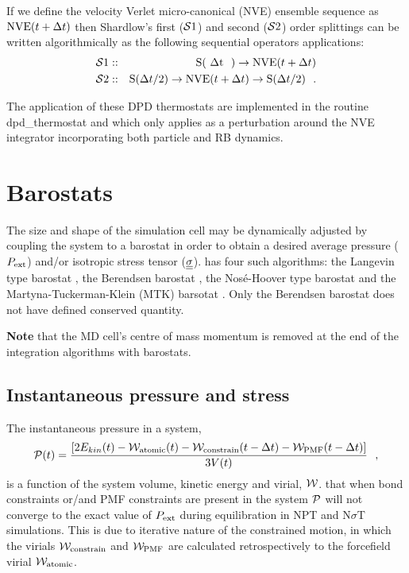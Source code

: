 If we define the velocity Verlet micro-canonical (NVE) ensemble sequence as
${\rm NVE}(t + \Delta t)$ then Shardlow's first (${\cal S}1$) and second (${\cal S}2$)
order splittings can be written algorithmically as the following sequential operators applications:
\begin{eqnarray}
{\cal S}1 &::& {\rm S(~\Delta t~~)} \rightarrow {\rm NVE}(t + \Delta t) \nonumber \\
{\cal S}2 &::& {\rm S}(\Delta t / 2) \rightarrow {\rm NVE}(t + \Delta t) \rightarrow {\rm S}(\Delta t / 2)~~.
\end{eqnarray}

The application of these DPD thermostats are implemented in the \D routine
{\sc dpd\_thermostat} and which only applies as a perturbation around the
NVE integrator incorporating both particle and RB dynamics.

\section{Barostats}

The size and shape of the simulation cell may be dynamically
adjusted by coupling the system to a barostat in order to obtain a
desired average pressure ($P_{\rm ext}$) and/or isotropic stress
tensor ($\mbox{$\underline{\underline{\bf \sigma}}$}$).  \D has four such
algorithms: the Langevin type barostat \cite{quigley-04a},
the Berendsen barostat \cite{berendsen-84a}, the
Nos\'{e}-Hoover type barostat \cite{hoover-85a} and the
Martyna-Tuckerman-Klein (MTK) barsotat \cite{martyna-96a}.  Only
the Berendsen barostat does not have defined conserved quantity.

{\bf Note} that the MD cell's centre of mass momentum is removed
at the end of the integration algorithms with barostats.

\subsection{Instantaneous pressure and stress}

The instantaneous pressure in a system,
\begin{equation}
{\cal P}(t) = \frac{\left[ 2 E_{kin}(t) - {\cal W}_{\rm atomic}(t) -
{\cal W}_{\rm constrain}(t - \Delta t) -
{\cal W}_{\rm PMF}(t - \Delta t) \right]} {3 V(t)}~~, \label{prs_inst}
\end{equation}
is a function of the system volume, kinetic energy and virial, ${\cal W}$.
 that when bond constraints or/and PMF constraints
are present in the system ${\cal P}$ will not converge to the exact
value of $P_{\rm ext}$ during equilibration in NPT and N$\sigma$T
simulations.  This is due to iterative nature of the constrained
motion, in which the virials ${\cal W}_{\rm constrain}$ and ${\cal W}_{\rm PMF}$
are calculated retrospectively to the forcefield virial ${\cal W}_{\rm atomic}$.

